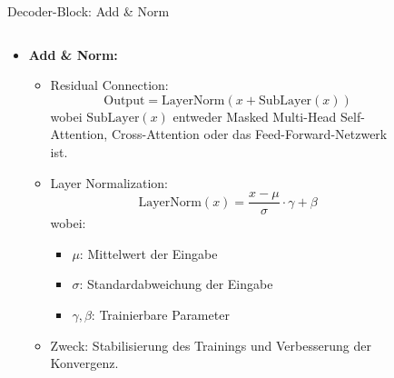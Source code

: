 \documentclass[aspectratio=1610, xcolor=dvipsnames, 9pt]{beamer}
\begin{document}
\begin{frame}{Decoder-Block: Add \& Norm}
  \begin{columns}
    \begin{column}{0.7\textwidth}
      \begin{itemize}
        \item \textbf{Add \& Norm:}
          \begin{itemize}
            \item Residual Connection:
              \[
              \text{Output} = \text{LayerNorm}(x + \text{SubLayer}(x))
              \]
              wobei \( \text{SubLayer}(x) \) entweder Masked Multi-Head Self-Attention, Cross-Attention oder das Feed-Forward-Netzwerk ist.
            \item Layer Normalization:
              \[
              \text{LayerNorm}(x) = \frac{x - \mu}{\sigma} \cdot \gamma + \beta
              \]
              wobei:
              \begin{itemize}
                \item \( \mu \): Mittelwert der Eingabe
                \item \( \sigma \): Standardabweichung der Eingabe
                \item \( \gamma, \beta \): Trainierbare Parameter
              \end{itemize}
            \item Zweck: Stabilisierung des Trainings und Verbesserung der Konvergenz.
          \end{itemize}
      \end{itemize}
    \end{column}
    \begin{column}{0.3\textwidth}
      \begin{figure}
        \centering

\end{figure}
\end{column}
\end{columns}
\end{frame}
\end{document}
